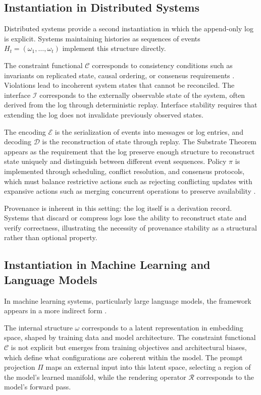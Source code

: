 \documentclass[12pt, a4paper]{article}
\theoremstyle{plain}
\theoremstyle{definition}
\theoremstyle{remark}
\begin{document}
\subsection{Instantiation in Distributed Systems}

Distributed systems provide a second instantiation in which the append-only log is explicit. Systems maintaining histories as sequences of events $H_t = (\omega_1, \dots, \omega_t)$ implement this structure directly.

The constraint functional $\mathcal{C}$ corresponds to consistency conditions such as invariants on replicated state, causal ordering, or consensus requirements \cite{lamport1978}. Violations lead to incoherent system states that cannot be reconciled. The interface $\mathcal{I}$ corresponds to the externally observable state of the system, often derived from the log through deterministic replay. Interface stability requires that extending the log does not invalidate previously observed states.

The encoding $\mathcal{E}$ is the serialization of events into messages or log entries, and decoding $\mathcal{D}$ is the reconstruction of state through replay. The Substrate Theorem appears as the requirement that the log preserve enough structure to reconstruct state uniquely and distinguish between different event sequences. Policy $\pi$ is implemented through scheduling, conflict resolution, and consensus protocols, which must balance restrictive actions such as rejecting conflicting updates with expansive actions such as merging concurrent operations to preserve availability \cite{gilbert2002}.

Provenance is inherent in this setting: the log itself is a derivation record. Systems that discard or compress logs lose the ability to reconstruct state and verify correctness, illustrating the necessity of provenance stability as a structural rather than optional property.

\subsection{Instantiation in Machine Learning and Language Models}

In machine learning systems, particularly large language models, the framework appears in a more indirect form \cite{vaswani2017,brown2020}.

The internal structure $\omega$ corresponds to a latent representation in embedding space, shaped by training data and model architecture. The constraint functional $\mathcal{C}$ is not explicit but emerges from training objectives and architectural biases, which define what configurations are coherent within the model. The prompt projection $\Pi$ maps an external input into this latent space, selecting a region of the model's learned manifold, while the rendering operator $\mathcal{R}$ corresponds to the model's forward pass.
\end{document}
